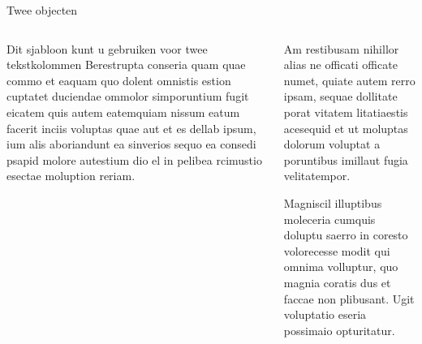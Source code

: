 \documentclass[showdate=true, slidenumbers=relative]{beamerruhuisstijl169}
\begin{document}
\begin{frame}{Twee objecten}
    \begin{columns}[T,totalwidth=\linewidth]
        \begin{column}{0.475\textwidth}
            \begin{block}{Dit sjabloon kunt u gebruiken voor twee tekstkolommen}
                Berestrupta conseria quam quae commo et eaquam quo dolent omnistis estion cuptatet duciendae ommolor simporuntium fugit eicatem quis autem eatemquiam nissum eatum facerit inciis voluptas quae
                aut et es dellab ipsum, ium alis aboriandunt ea sinverios sequo ea consedi psapid molore autestium dio el in pelibea rcimustio esectae moluption reriam.
            \end{block}
        \end{column}
        \begin{column}{0.475\textwidth}
            \begin{block}{}
                Am restibusam nihillor alias ne officati officate numet, quiate autem rerro ipsam, sequae dollitate porat vitatem litatiaestis acesequid et ut moluptas dolorum voluptat a poruntibus imillaut fugia velitatempor.
            \end{block}
            \begin{block}{}
                Magniscil illuptibus moleceria cumquis doluptu saerro in coresto volorecesse modit qui omnima volluptur, quo magnia coratis dus et faccae non plibusant. Ugit voluptatio eseria possimaio opturitatur.
            \end{block}
        \end{column}
    \end{columns}
\end{frame}
\end{document}
